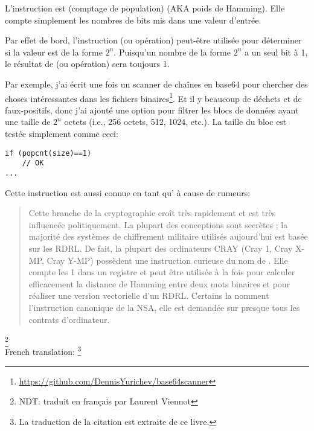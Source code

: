 \label{POPCNT}

L'instruction  est  (comptage de population) (\ac{AKA}
poids de Hamming). Elle compte simplement les nombres de bits mis dans une valeur
d'entrée.

Par effet de bord, l'instruction  (ou opération) peut-être utilisée pour
déterminer si la valeur est de la forme $2^n$. Puisqu'un nombre de la forme $2^n$
a un seul bit à 1, le résultat de  (ou opération) sera toujours 1.

Par exemple, j'ai écrit une fois un scanner de chaînes en base64 pour chercher des
choses intéressantes dans les fichiers binaires\footnote{\url{https://github.com/DennisYurichev/base64scanner}}.
Et il y  beaucoup de déchets et de faux-positifs, donc j'ai ajouté une option pour
filtrer les blocs de données ayant une taille de $2^n$ octets (i.e., 256 octets,
512, 1024, etc.).
La taille du bloc est testée simplement comme ceci:

\begin{lstlisting}[style=customc]
if (popcnt(size)==1)
	// OK
...
\end{lstlisting}

Cette instruction est aussi connue en tant qu' à cause de
rumeurs:

\begin{framed}
\begin{quotation}
Cette branche de la cryptographie croît très rapidement et est très influencée politiquement.
La plupart des conceptions sont secrètes ; la majorité des systèmes de chiffrement
militaire utilisés aujourd'hui est basée sur les RDRL. De fait, la plupart des ordinateurs
CRAY (Cray 1, Cray X-MP, Cray Y-MP) possèdent une instruction curieuse du
nom de .
Elle compte les 1 dans un registre et peut être
utilisée à la fois pour calculer efficacement la distance de Hamming entre deux mots
binaires et pour réaliser une version vectorielle d'un RDRL. Certains la nomment
l'instruction canonique de la NSA, elle est demandée sur presque tous les contrats
d'ordinateur.
\end{quotation}
\end{framed}
\InSqBrackets{\Schneier{}}\footnote{NDT: traduit en français par Laurent Viennot}\\
French translation: \footnote{La
traduction de la citation est extraite de ce livre.}

